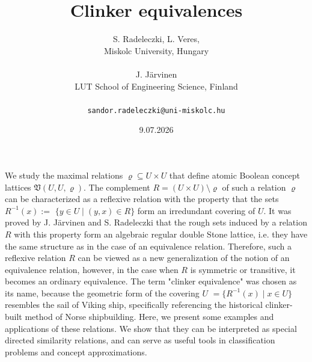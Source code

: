 \documentclass[a4paper]{article} %
\date{9.07.2026} %
\begin{document}
\setcounter{page}{1} %

\title{Clinker equivalences}

\author{S. Radeleczki, L. Veres, \\ %
       Miskolc University, Hungary\\ \\ %
       J. J\"{a}rvinen \\ %
       LUT School of Engineering Science, Finland\\ \\ %
       \texttt{sandor.radeleczki@uni-miskolc.hu} %
       }%

\maketitle



We study the maximal relations $\varrho\subseteq U\times U$ that define atomic
Boolean concept lattices $\mathfrak{V}(U,U,\varrho)$. The complement
$R=\left(  U\times U\right)  \setminus\varrho$ of such a relation $\varrho$
can be characterized as a reflexive relation with the property that the sets
$R^{-1}(x):=$ $\{y\in U\mid(y,x)\in R\}$ form an irredundant covering of $U$.
It was proved by J. J\"{a}rvinen and S. Radeleczki that the rough sets induced
by a relation $R$ with this property form an algebraic regular double Stone
lattice, i.e. they have the same structure as in the case of an equivalence
relation. Therefore, such a reflexive relation $R$ can be viewed as a new
generalization of the notion of an equivalence relation, however, in the case
when $R$ is symmetric or transitive, it becomes an ordinary equivalence. The
term "clinker equivalence" was chosen as its name, because the geometric form
of the covering $U$ $=\{R^{-1}(x)\mid x\in U\}$ resembles the sail of Viking
ship, specifically referencing the historical clinker-built method of Norse
shipbuilding. Here, we present some examples and applications of these
relations. We show that they can be interpreted as special directed similarity
relations, and can serve as useful tools in classification problems and
concept approximations.
\end{document}
